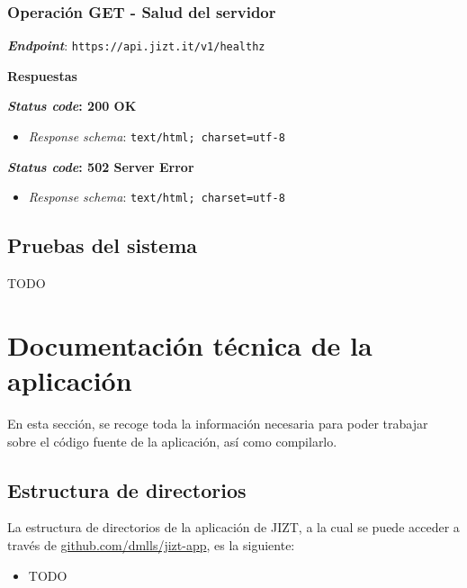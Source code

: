 \subsubsection{Operación GET - Salud del servidor}

\textbf{\emph{Endpoint}}: \texttt{https://api.jizt.it/v1/healthz}

\vspace{0.3cm}
\textbf{Respuestas}

\textbf{\emph{Status code}: 200 OK}

\vspace{-0.3cm}
\begin{itemize} [\textbullet]
	\item \emph{Response schema}: \texttt{text/html; charset=utf-8}
\end{itemize}

\textbf{\emph{Status code}: 502 Server Error}

\vspace{-0.3cm}
\begin{itemize} [\textbullet]
	\item \emph{Response schema}: \texttt{text/html; charset=utf-8}
\end{itemize}


\subsection{Pruebas del sistema}

TODO



\section{Documentación técnica de la aplicación}

En esta sección, se recoge toda la información necesaria para poder trabajar sobre el código fuente de la aplicación, así como compilarlo.


\subsection{Estructura de directorios}

La estructura de directorios de la aplicación de JIZT, a la cual se puede acceder a través de \href{https://github.com/dmlls/jizt-app}{github.com/dmlls/jizt-app}, es la siguiente:

\vspace{-0.2cm}
\begin{itemize} [\textbullet]
	\tightlist
	\item TODO
\end{itemize}


